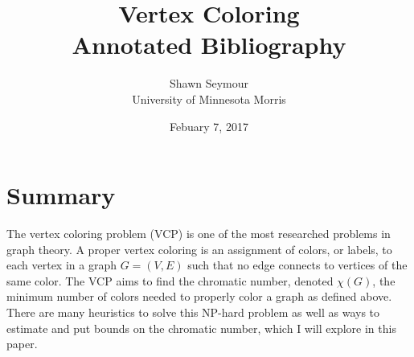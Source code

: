\documentclass [11pt]{article}
\title{Vertex Coloring\\\medskip Annotated Bibliography}
\author{Shawn Seymour\\University of Minnesota Morris}
\date{Febuary 7, 2017}
\begin{document}
\maketitle
\section*{Summary}
The vertex coloring problem (VCP) is one of the most researched problems in graph theory. A proper vertex coloring is an assignment of colors, or labels, to each vertex in a graph \(G = (V, E)\) such that no edge connects to vertices of the same color. The VCP aims to find the chromatic number, denoted \(\chi(G)\), the minimum number of colors needed to properly color a graph as defined above. There are many heuristics to solve this NP-hard problem as well as ways to estimate and put bounds on the chromatic number, which I will explore in this paper.

\nocite{*}


\end{document}
